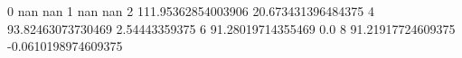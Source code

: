 0 nan nan
1 nan nan
2 111.95362854003906 20.673431396484375
4 93.82463073730469 2.54443359375
6 91.28019714355469 0.0
8 91.21917724609375 -0.0610198974609375
